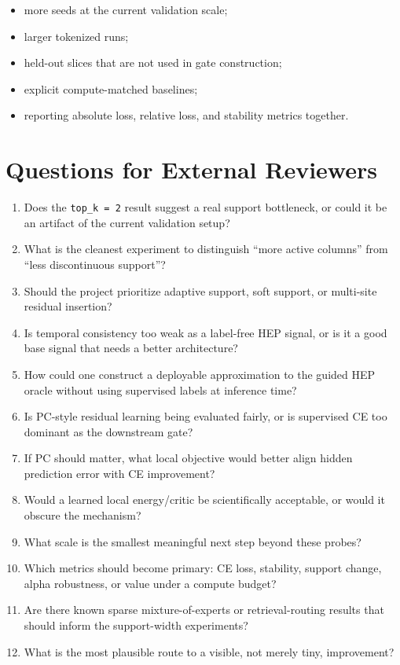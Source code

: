 \documentclass[11pt]{article}
\begin{document}
\begin{itemize}
  \item more seeds at the current validation scale;
  \item larger tokenized runs;
  \item held-out slices that are not used in gate construction;
  \item explicit compute-matched baselines;
  \item reporting absolute loss, relative loss, and stability metrics together.
\end{itemize}

\section{Questions for External Reviewers}

\begin{enumerate}
  \item Does the \texttt{top\_k = 2} result suggest a real support bottleneck,
  or could it be an artifact of the current validation setup?
  \item What is the cleanest experiment to distinguish ``more active columns''
  from ``less discontinuous support''?
  \item Should the project prioritize adaptive support, soft support, or
  multi-site residual insertion?
  \item Is temporal consistency too weak as a label-free HEP signal, or is it a
  good base signal that needs a better architecture?
  \item How could one construct a deployable approximation to the guided HEP
  oracle without using supervised labels at inference time?
  \item Is PC-style residual learning being evaluated fairly, or is supervised
  CE too dominant as the downstream gate?
  \item If PC should matter, what local objective would better align hidden
  prediction error with CE improvement?
  \item Would a learned local energy/critic be scientifically acceptable, or
  would it obscure the mechanism?
  \item What scale is the smallest meaningful next step beyond these probes?
  \item Which metrics should become primary: CE loss, stability, support
  change, alpha robustness, or value under a compute budget?
  \item Are there known sparse mixture-of-experts or retrieval-routing results
  that should inform the support-width experiments?
  \item What is the most plausible route to a visible, not merely tiny,
  improvement?
\end{enumerate}
\end{document}
